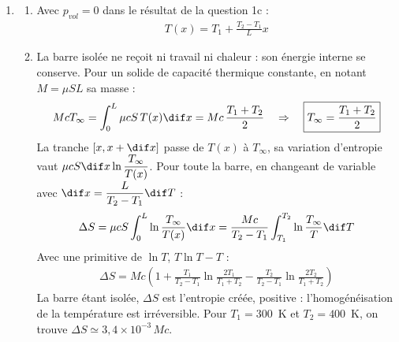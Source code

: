 \begin{correction}
\begin{enumerate}
\begin{enumerate}
	\item On fait un bilan d'entropie sur la tranche $[x,x+\dif x]$ pendant $\dif t$. L'entropie échangée à travers une section d'abscisse $x$ vaut $\dfrac{\delta Q}{T}=\dfrac{j(x)S\dif t}{T(x)}$. Le travail électrique n'apporte pas d'entropie. En régime permanent, l'entropie de la tranche est constante :
	\begin{align*}
		0=\frac{j(x)}{T(x)}S\dif t-\frac{j(x+\dif x)}{T(x+\dif x)}S\dif t+s_cS\dif x\dif t \quad\Rightarrow\quad s_c=\frac{\dif}{\dif x}\left(\frac{j}{T}\right)=-\lambda\frac{\dif}{\dif x}\left(\frac{1}{T}\frac{\dif T}{\dif x}\right)
	\end{align*}
	En développant et en utilisant $\lambda T''=-p_{vol}$ :
	\begin{align*}
		\boxed{s_c=\frac{\rho I^2}{S^2T}+\frac{\lambda}{T^2}\left(\frac{\dif T}{\dif x}\right)^2}
	\end{align*}
	Les deux termes sont positifs, conformément au second principe. Le premier traduit l'irréversibilité de l'effet Joule, le second celle de la conduction thermique. Même sans courant, il y a création d'entropie dès que $T_1\neq T_2$.

\end{enumerate}

\item

\begin{enumerate}

	\item Avec $p_{vol}=0$ dans le résultat de la question 1c :
	\begin{align*}
		T(x)=T_1+\frac{T_2-T_1}{L}x
	\end{align*}

	\item La barre isolée ne reçoit ni travail ni chaleur : son énergie interne se conserve. Pour un solide de capacité thermique constante, en notant $M=\mu SL$ sa masse :
	\begin{align*}
		McT_\infty=\int_0^L\mu cS\,T(x)\dif x=Mc\,\frac{T_1+T_2}{2} \quad\Rightarrow\quad \boxed{T_\infty=\frac{T_1+T_2}{2}}
	\end{align*}
	La tranche $[x,x+\dif x]$ passe de $T(x)$ à $T_\infty$, sa variation d'entropie vaut $\mu cS\dif x\ln\dfrac{T_\infty}{T(x)}$. Pour toute la barre, en changeant de variable avec $\dif x=\dfrac{L}{T_2-T_1}\dif T$ :
	\begin{align*}
		\Delta S=\mu cS\int_0^L\ln\frac{T_\infty}{T(x)}\dif x=\frac{Mc}{T_2-T_1}\int_{T_1}^{T_2}\ln\frac{T_\infty}{T}\dif T
	\end{align*}
	Avec une primitive de $\ln T$, $T\ln T-T$ :
	\begin{align*}
		\boxed{\Delta S = Mc \left( 1 + \frac{T_1}{T_2-T_1}\ln\frac{2T_1}{T_1+T_2} - \frac{T_2}{T_2-T_1}\ln\frac{2T_2}{T_1+T_2}\right)}
	\end{align*}
	La barre étant isolée, $\Delta S$ est l'entropie créée, positive : l'homogénéisation de la température est irréversible. Pour $T_1=300$~K et $T_2=400$~K, on trouve $\Delta S\simeq3{,}4\times10^{-3}\,Mc$.


\end{enumerate}
\end{enumerate}
\end{correction}
